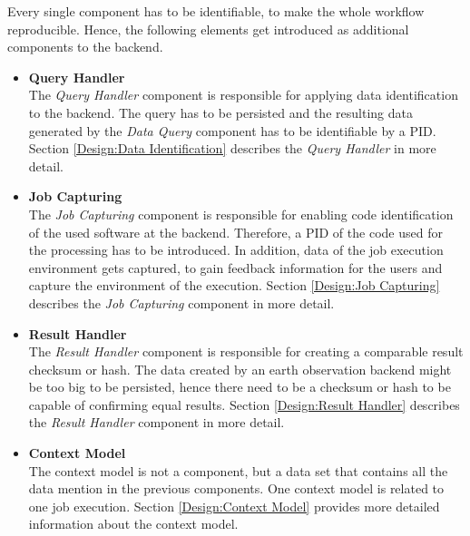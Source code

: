 \documentclass[draft,final]{vutinfth} %
\begin{document}
Every single component has to be identifiable, to make the whole workflow reproducible. Hence, the following elements get introduced as additional components to the backend.

 \begin{itemize}
	\item \textbf{Query Handler} \\
	The \textit{Query Handler} component is responsible for applying data identification to the backend. The query has to be persisted and the resulting data generated by the \textit{Data Query} component has to be identifiable by a PID. Section \ref{Design:Data Identification} describes the \textit{Query Handler} in more detail.     
	\item \textbf{Job Capturing} \\ 
	The \textit{Job Capturing} component is responsible for enabling code identification of the used software at the backend. Therefore, a PID of the code used for the processing has to be introduced. In addition, data of the job execution environment gets captured, to gain feedback information for the users and capture the environment of the execution. Section \ref{Design:Job Capturing} describes the \textit{Job Capturing} component in more detail.
	\item \textbf{Result Handler} \\
	The \textit{Result Handler} component is responsible for creating a comparable result checksum or hash. The data created by an earth observation backend might be too big to be persisted, hence there need to be a checksum or hash to be capable of confirming equal results. Section \ref{Design:Result Handler} describes the \textit{Result Handler} component in more detail.   
	\item \textbf{Context Model} \\ 
	The context model is not a component, but a data set that contains all the data mention in the previous components. One context model is related to one job execution. Section \ref{Design:Context Model} provides more detailed information about the context model. 
\end{itemize}
\end{document}
